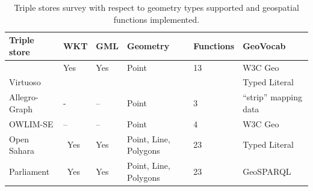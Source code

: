 \documentclass[a4paper,11pt]{report}
\begin{document}
\begin{table}
 \begin{tabularx}{\textwidth}{|X|X|X|X|X|X|}
 \hline
 \textbf{Triple store} & WKT & GML & Geometry   & Functions &     GeoVocab \\ \hline
                                   
  & Yes & Yes & Point & 13 & W3C Geo   \\ 
  Virtuoso  &       &       &          &                      &  Typed Literal  \\ \hline
 Allegro-Graph & \-- & -- & Point & 3  & ``strip'' mapping data \\ \hline
 OWLIM-SE & -- & -- & Point & 4 & W3C Geo\\ \hline
 Open Sahara & \ Yes & Yes & Point, Line, Polygons & 23  & Typed Literal \\ \hline
 Parliament & \ Yes & Yes & Point, Line, Polygons & 23   &  GeoSPARQL \\ \hline
 \end{tabularx}
\caption{Triple stores survey with respect to geometry types supported and geospatial functions implemented.}
\label{tab:triplestore}
\end{table}



 
\end{document}
